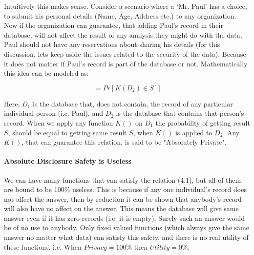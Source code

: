 \documentclass[12pt]{report}
\theoremstyle{named}
\begin{document}
Intuitively this makes sense. Consider a scenario where a `Mr. Paul' has a choice, to submit his personal details (Name, Age, Address etc.) to any organization.  Now if the organization can guarantee, that adding Paul's record in their database, will not affect the result of any analysis they might do with the data, Paul should not have any reservations about sharing his details (for this discussion, lets keep aside the issues related to the security of the data). Because it does not matter if Paul's record is part of the database or not. Mathematically this idea can be modeled as:

\begin{equation}
[Pr[\mathit{K}(D_{1})\in S]  = Pr[\mathit{K}(D_{2})\in S]]
\end{equation}

Here, $D_{1}$ is the database that, does not contain, the record of any particular individual person (i.e. Paul), and  $D_{2}$ is the database that contains that person's record. When we apply any function $K()$ on  $D_{1}$ the probability of getting result $S$, should be equal to getting same result $S$, when $K()$ is applied to $D_{2}$. Any $K()$, that can guarantee this relation, is said to be "Absolutely Private".

\paragraph{Absolute Disclosure Safety is Useless\\}
We can have many functions that can satisfy the relation (4.1), but all of them are bound to be 100\% useless. This is because if any one individual's record does not affect the answer, then by reduction it can be shown that anybody's record will also have no affect on the answer. This means the database will give same answer even if it has zero records (i.e. it is empty). Surely such an answer would be of no use to anybody. Only fixed valued functions (which always give the same answer no matter what data) can satisfy this safety, and there is no real utility of these functions. i.e. When $Privacy = 100\%$ then $Utility = 0\%$.

\end{document}
